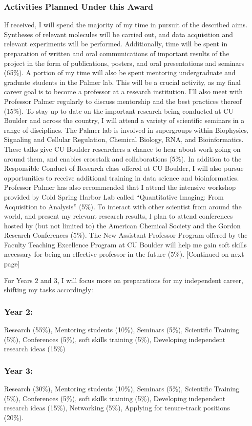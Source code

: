 \documentclass{F32}
\begin{document}
\subsubsection*{Activities Planned Under this Award}
If received, I will spend the majority of my time in pursuit of the described aims. Syntheses of relevant molecules will be carried out, and data acquisition and relevant experiments will be performed. Additionally, time will be spent in preparation of written and oral communications of important results of the project in the form of publications, posters, and oral presentations and seminars (65\%).
A portion of my time will also be spent mentoring undergraduate and graduate students in the Palmer lab. This will be a crucial activity, as my final career goal is to become a professor at a research institution. I'll also meet with Professor Palmer regularly to discuss mentorship and the best practices thereof (15\%).
To stay up-to-date on the important research being conducted at CU Boulder and across the country, I will attend a variety of scientific seminars in a range of disciplines. The Palmer lab is involved in supergroups within Biophysics, Signaling and Cellular Regulation, Chemical Biology, RNA, and Bioinformatics. These talks give CU Boulder researchers a chance to hear about work going on around them, and enables crosstalk and collaborations (5\%).
In addition to the Responsible Conduct of Research class offered at CU Boulder, I will also pursue opportunities to receive additional training in data science and bioinformatics. Professor Palmer has also recommended that I attend the intensive workshop provided by Cold Spring Harbor Lab called ``Quantitative Imaging: From Acquisition to Analysis'' (5\%).
To interact with other scientist from around the world, and present my relevant research results, I plan to attend conferences hosted by (but not limited to) the American Chemical Society and the Gordon Research Conferences (5\%).
The New Assistant Professor Program offered by the Faculty Teaching Excellence Program at CU Boulder will help me gain soft skills necessary for being an effective professor in the future (5\%). [Continued on next page]

For Years 2 and 3, I will focus more on preparations for my independent career, shifting my tasks accordingly:

\subsubsection*{Year 2:}
Research (55\%), Mentoring students (10\%), Seminars (5\%), Scientific Training (5\%), Conferences (5\%), soft skills training (5\%), Developing independent research ideas (15\%)

\subsubsection*{Year 3:}
Research (30\%), Mentoring students (10\%), Seminars (5\%), Scientific Training (5\%), Conferences (5\%), soft skills training (5\%), Developing independent research ideas (15\%), Networking (5\%), Applying for tenure-track positions (20\%).
\end{document}
